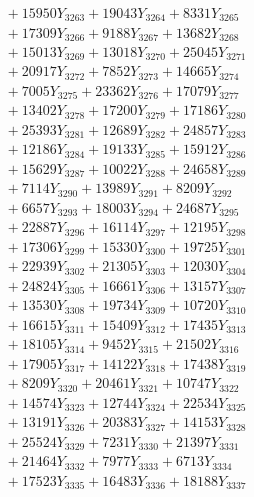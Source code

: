 \documentclass[a4paper,10pt]{article}
\begin{document}
{\begin{align}
&\;  + 15950 Y_{3263} + 19043 Y_{3264} + 8331 Y_{3265} \\[0.3ex]
&\;  + 17309 Y_{3266} + 9188 Y_{3267} + 13682 Y_{3268} \\[0.5ex]\allowbreak
&\;  + 15013 Y_{3269} + 13018 Y_{3270} + 25045 Y_{3271} \\[0.3ex]
&\;  + 20917 Y_{3272} + 7852 Y_{3273} + 14665 Y_{3274} \\[0.3ex]
&\;  + 7005 Y_{3275} + 23362 Y_{3276} + 17079 Y_{3277} \\[0.3ex]
&\;  + 13402 Y_{3278} + 17200 Y_{3279} + 17186 Y_{3280} \\[0.3ex]
&\;  + 25393 Y_{3281} + 12689 Y_{3282} + 24857 Y_{3283} \\[0.3ex]
&\;  + 12186 Y_{3284} + 19133 Y_{3285} + 15912 Y_{3286} \\[0.3ex]
&\;  + 15629 Y_{3287} + 10022 Y_{3288} + 24658 Y_{3289} \\[0.3ex]
&\;  + 7114 Y_{3290} + 13989 Y_{3291} + 8209 Y_{3292} \\[0.3ex]
&\;  + 6657 Y_{3293} + 18003 Y_{3294} + 24687 Y_{3295} \\[0.3ex]
&\;  + 22887 Y_{3296} + 16114 Y_{3297} + 12195 Y_{3298} \\[0.5ex]\allowbreak
&\;  + 17306 Y_{3299} + 15330 Y_{3300} + 19725 Y_{3301} \\[0.3ex]
&\;  + 22939 Y_{3302} + 21305 Y_{3303} + 12030 Y_{3304} \\[0.3ex]
&\;  + 24824 Y_{3305} + 16661 Y_{3306} + 13157 Y_{3307} \\[0.3ex]
&\;  + 13530 Y_{3308} + 19734 Y_{3309} + 10720 Y_{3310} \\[0.3ex]
&\;  + 16615 Y_{3311} + 15409 Y_{3312} + 17435 Y_{3313} \\[0.3ex]
&\;  + 18105 Y_{3314} + 9452 Y_{3315} + 21502 Y_{3316} \\[0.3ex]
&\;  + 17905 Y_{3317} + 14122 Y_{3318} + 17438 Y_{3319} \\[0.3ex]
&\;  + 8209 Y_{3320} + 20461 Y_{3321} + 10747 Y_{3322} \\[0.3ex]
&\;  + 14574 Y_{3323} + 12744 Y_{3324} + 22534 Y_{3325} \\[0.3ex]
&\;  + 13191 Y_{3326} + 20383 Y_{3327} + 14153 Y_{3328} \\[0.5ex]\allowbreak
&\;  + 25524 Y_{3329} + 7231 Y_{3330} + 21397 Y_{3331} \\[0.3ex]
&\;  + 21464 Y_{3332} + 7977 Y_{3333} + 6713 Y_{3334} \\[0.3ex]
&\;  + 17523 Y_{3335} + 16483 Y_{3336} + 18188 Y_{3337} \\[0.3ex]

\end{align}}
\end{document}

